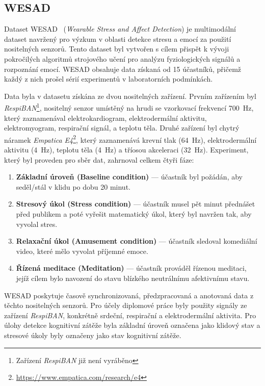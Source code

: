 \subsection{WESAD}
\label{subsec:wesad}
Dataset WESAD~\cite{wesadDataset} (\textit{Wearable Stress and Affect
Detection}) je multimodální dataset navržený pro výzkum v oblasti detekce stresu
a emocí za použití nositelných senzorů. Tento dataset byl vytvořen s cílem
přispět k vývoji pokročilých algoritmů strojového učení pro analýzu
fyziologických signálů a rozpoznání emocí. WESAD obsahuje data získaná od 15
účastníků, přičemž každý z nich prošel sérií experimentů v laboratorních
podmínkách.

Data byla v datasetu získána ze dvou nositelných zařízení. Prvním zařízením byl
\textit{RespiBAN}\footnote{Zařízení \textit{RespiBAN} již není vyráběno},
nositelný senzor umístěný na hrudi se vzorkovací frekvencí 700~Hz, který
zaznamenával elektrokardiogram, elektrodermální aktivitu, elektromyogram,
respirační signál, a teplotu těla. Druhé zařízení byl chytrý náramek
\textit{Empatica E4}\footnote{\url{https://www.empatica.com/research/e4}}, který
zaznamenává krevní tlak (64~Hz), elektrodermální aktivitu (4~Hz), teplotu těla
(4~Hz) a tříosou akceleraci (32~Hz). Experiment, který byl proveden pro sběr
dat, zahrnoval celkem čtyři fáze:
\begin{enumerate}
    \item \textbf{Základní úroveň (Baseline condition)} --- účastník byl požádán, aby
    seděl/stál v klidu po dobu 20 minut.
    \item  \textbf{Stresový úkol (Stress condition)} --- účastník musel pět minut
    přednášet před publikem a poté vyřešit matematický úkol, který byl navržen
    tak, aby vyvolal stres.
    \item  \textbf{Relaxační úkol (Amusement condition)} --- účastník sledoval
    komediální video, které mělo vyvolat příjemné emoce.
    \item  \textbf{Řízená meditace (Meditation)} --- účastník prováděl řízenou
    meditaci, jejíž cílem bylo navození do stavu blízkého neutrálnímu
    afektivnímu stavu.
\end{enumerate}

WESAD poskytuje časově synchronizovaná, předzpracovaná a anotovaná data z těchto
nositelných senzorů. Pro účely diplomové práce byly použity signály ze zařízení
\textit{RespiBAN}, konkrétně srdeční, respirační a elektrodermální aktivita. Pro
úlohy detekce kognitivní zátěže byla základní úroveň označena jako klidový stav
a stresové úkoly byly označeny jako stav kognitivní zátěže.

